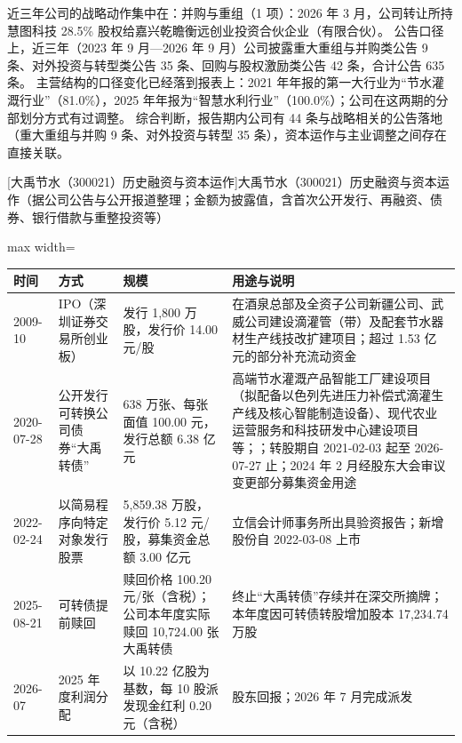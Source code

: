  近三年公司的战略动作集中在：并购与重组（1 项）：2026 年 3 月，公司转让所持慧图科技 28.5\% 股权给嘉兴乾瞻衡远创业投资合伙企业（有限合伙）。 公告口径上，近三年（2023 年 9 月---2026 年 9 月）公司披露重大重组与并购类公告 9 条、对外投资与转型类公告 35 条、回购与股权激励类公告 42 条，合计公告 635 条。 主营结构的口径变化已经落到报表上：2021 年年报的第一大行业为“节水灌溉行业”（81.0\%），2025 年年报为“智慧水利行业”（100.0\%）；公司在这两期的分部划分方式有过调整。 综合判断，报告期内公司有 44 条与战略相关的公告落地（重大重组与并购 9 条、对外投资与转型 35 条），资本运作与主业调整之间存在直接关联。

\begin{center}\small\setlength{\tabcolsep}{4pt}
[大禹节水（300021）历史融资与资本运作]{大禹节水（300021）历史融资与资本运作（据公司公告与公开报道整理；金额为披露值，含首次公开发行、再融资、债券、银行借款与重整投资等）}
\begin{adjustbox}{max width=\textwidth}
\begin{tabular}{@{}p{1.45cm}p{2.55cm}p{4.05cm}p{4.95cm}@{}}
\toprule
时间 & 方式 & 规模 & 用途与说明 \\
\midrule
2009-10 & IPO（深圳证券交易所创业板） & 发行 1,\allowbreak{}800 万股，\allowbreak{}发行价 14.00 元/\allowbreak{}股 & 在酒泉总部及全资子公司新疆公司、\allowbreak{}武威公司建设滴灌管（带）及配套节水器材生产线技改扩建项目；超过 1.53 亿元的部分补充流动资金 \\
2020-07-28 & 公开发行可转换公司债券“大禹转债” & 638 万张、\allowbreak{}每张面值 100.00 元，\allowbreak{}发行总额 6.38 亿元 & 高端节水灌溉产品智能工厂建设项目（拟配备以色列先进压力补偿式滴灌生产线及核心智能制造设备）、\allowbreak{}现代农业运营服务和科技研发中心建设项目等；；转股期自 2021-02-03 起至 2026-07-27 止；2024 年 2 月经股东大会审议变更部分募集资金用途 \\
2022-02-24 & 以简易程序向特定对象发行股票 & 5,\allowbreak{}859.38 万股，\allowbreak{}发行价 5.12 元/\allowbreak{}股，\allowbreak{}募集资金总额 3.00 亿元 & 立信会计师事务所出具验资报告；新增股份自 2022-03-08 上市 \\
2025-08-21 & 可转债提前赎回 & 赎回价格 100.20 元/\allowbreak{}张（含税）；公司本年度实际赎回 10,\allowbreak{}724.00 张大禹转债 & 终止“大禹转债”存续并在深交所摘牌；本年度因可转债转股增加股本 17,\allowbreak{}234.74 万股 \\
2026-07 & 2025 年度利润分配 & 以 10.22 亿股为基数，\allowbreak{}每 10 股派发现金红利 0.20 元（含税） & 股东回报；2026 年 7 月完成派发 \\
\bottomrule
\end{tabular}
\end{adjustbox}
\end{center}


